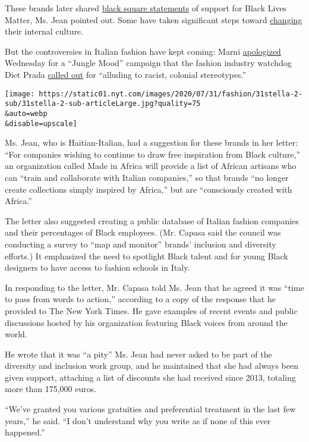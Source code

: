 These brands later shared
\href{https://www.nytimes.com/2020/06/06/style/fashion-racism-actions.html}{black
square statements} of support for Black Lives Matter, Ms. Jean pointed
out. Some have taken significant steps toward
\href{https://www.vogue.com/article/gucci-diversity-inclusion-renee-tirado}{changing}
their internal culture.

But the controversies in Italian fashion have kept coming: Marni
\href{https://www.instagram.com/p/CDPtl8EHYAr/}{apologized} Wednesday
for a ``Jungle Mood'' campaign that the fashion industry watchdog Diet
Prada \href{https://www.instagram.com/p/CDMR7AjnYUx/?hl=en}{called out}
for ``alluding to racist, colonial stereotypes.''

\texttt{[image: https://static01.nyt.com/images/2020/07/31/fashion/31stella-2-sub/31stella-2-sub-articleLarge.jpg?quality=75\\\&auto=webp\\\&disable=upscale]}

Ms. Jean, who is Haitian-Italian, had a suggestion for these brands in
her letter: ``For companies wishing to continue to draw free inspiration
from Black culture,'' an organization called Made in Africa will provide
a list of African artisans who can ``train and collaborate with Italian
companies,'' so that brands ``no longer create collections simply
inspired by Africa,'' but are ``consciously created with Africa.''

The letter also suggested creating a public database of Italian fashion
companies and their percentages of Black employees. (Mr. Capasa said the
council was conducting a survey to ``map and monitor'' brands' inclusion
and diversity efforts.) It emphasized the need to spotlight Black talent
and for young Black designers to have access to fashion schools in
Italy.

In responding to the letter, Mr. Capasa told Ms. Jean that he agreed it
was ``time to pass from words to action,'' according to a copy of the
response that he provided to The New York Times. He gave examples of
recent events and public discussions hosted by his organization
featuring Black voices from around the world.

He wrote that it was ``a pity'' Ms. Jean had never asked to be part of
the diversity and inclusion work group, and he maintained that she had
always been given support, attaching a list of discounts she had
received since 2013, totaling more than 175,000 euros.

``We've granted you various gratuities and preferential treatment in the
last few years,'' he said. ``I don't understand why you write as if none
of this ever happened.''

